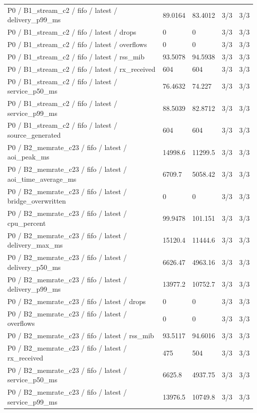 \begin{tabular}{@{}lllll@{}}
P0 / B1\_stream\_c2 / fifo / latest / delivery\_p99\_ms & 89.0164 & 83.4012 & 3/3 & 3/3 \\
P0 / B1\_stream\_c2 / fifo / latest / drops & 0 & 0 & 3/3 & 3/3 \\
P0 / B1\_stream\_c2 / fifo / latest / overflows & 0 & 0 & 3/3 & 3/3 \\
P0 / B1\_stream\_c2 / fifo / latest / rss\_mib & 93.5078 & 94.5938 & 3/3 & 3/3 \\
P0 / B1\_stream\_c2 / fifo / latest / rx\_received & 604 & 604 & 3/3 & 3/3 \\
P0 / B1\_stream\_c2 / fifo / latest / service\_p50\_ms & 76.4632 & 74.227 & 3/3 & 3/3 \\
P0 / B1\_stream\_c2 / fifo / latest / service\_p99\_ms & 88.5039 & 82.8712 & 3/3 & 3/3 \\
P0 / B1\_stream\_c2 / fifo / latest / source\_generated & 604 & 604 & 3/3 & 3/3 \\
P0 / B2\_memrate\_c23 / fifo / latest / aoi\_peak\_ms & 14998.6 & 11299.5 & 3/3 & 3/3 \\
P0 / B2\_memrate\_c23 / fifo / latest / aoi\_time\_average\_ms & 6709.7 & 5058.42 & 3/3 & 3/3 \\
P0 / B2\_memrate\_c23 / fifo / latest / bridge\_overwritten & 0 & 0 & 3/3 & 3/3 \\
P0 / B2\_memrate\_c23 / fifo / latest / cpu\_percent & 99.9478 & 101.151 & 3/3 & 3/3 \\
P0 / B2\_memrate\_c23 / fifo / latest / delivery\_max\_ms & 15120.4 & 11444.6 & 3/3 & 3/3 \\
P0 / B2\_memrate\_c23 / fifo / latest / delivery\_p50\_ms & 6626.47 & 4963.16 & 3/3 & 3/3 \\
P0 / B2\_memrate\_c23 / fifo / latest / delivery\_p99\_ms & 13977.2 & 10752.7 & 3/3 & 3/3 \\
P0 / B2\_memrate\_c23 / fifo / latest / drops & 0 & 0 & 3/3 & 3/3 \\
P0 / B2\_memrate\_c23 / fifo / latest / overflows & 0 & 0 & 3/3 & 3/3 \\
P0 / B2\_memrate\_c23 / fifo / latest / rss\_mib & 93.5117 & 94.6016 & 3/3 & 3/3 \\
P0 / B2\_memrate\_c23 / fifo / latest / rx\_received & 475 & 504 & 3/3 & 3/3 \\
P0 / B2\_memrate\_c23 / fifo / latest / service\_p50\_ms & 6625.8 & 4937.75 & 3/3 & 3/3 \\
P0 / B2\_memrate\_c23 / fifo / latest / service\_p99\_ms & 13976.5 & 10749.8 & 3/3 & 3/3 \\

\end{tabular}

